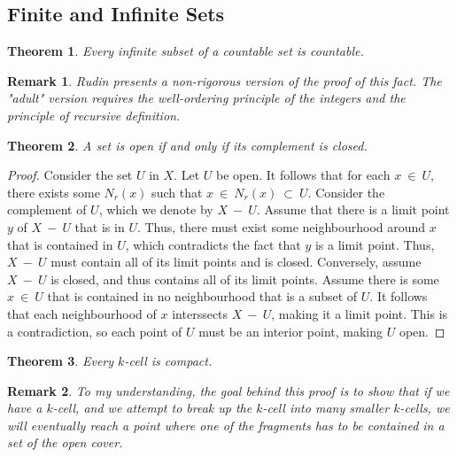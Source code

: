 \documentclass[10pt, oneside]{article}
\newtheorem{thm}{Theorem}
\newtheorem{rem}{Remark}
\begin{document}
\subsection{Finite and Infinite Sets}

\begin{thm}
	Every infinite subset of a countable set is countable.
\end{thm}

\begin{rem}
	Rudin presents a non-rigorous version of the proof of this fact. The "adult" version requires the well-ordering principle
	of the integers and the principle of recursive definition.
\end{rem}

\begin{thm}
	A set is open if and only if its complement is closed.
\end{thm}

\begin{proof}
	Consider the set $U$ in $X$. Let $U$ be open. It follows that for each $x \ \in \ U$, there exists some $N_r(x)$ such that 
	$x \ \in \ N_r(x) \ \subset \ U$. Consider the complement of $U$, which we denote by $X \ - \ U$. Assume that there is a 
	limit point $y$ of $X \ - \ U$ that is in $U$. Thus, there must exist some neighbourhood around $x$ that is contained in 
	$U$, which contradicts the fact that $y$ is a limit point. Thus, $X \ - \ U$ must contain all of its limit points and 
	is closed.
	\newline\newline
	Conversely, assume $X \ - \ U$ is closed, and thus contains all of its limit points. Assume there is some $x \ \in \ U$ 
	that is contained in no neighbourhood that is a subset of $U$. It follows that each neighbourhood of $x$ interssects 
	$X \ - \ U$, making it a limit point. This is a contradiction, so each point of $U$ must be an interior point, making 
	$U$ open.
\end{proof}

\begin{thm}
	Every $k$-cell is compact.
\end{thm}

\begin{rem}
	To my understanding, the goal behind this proof is to show that if we have a $k$-cell, and we attempt to break 
	up the $k$-cell into many smaller $k$-cells, we will eventually reach a point where one of the fragments has to 
	be contained in a set of the open cover.
\end{rem}
\end{document}
